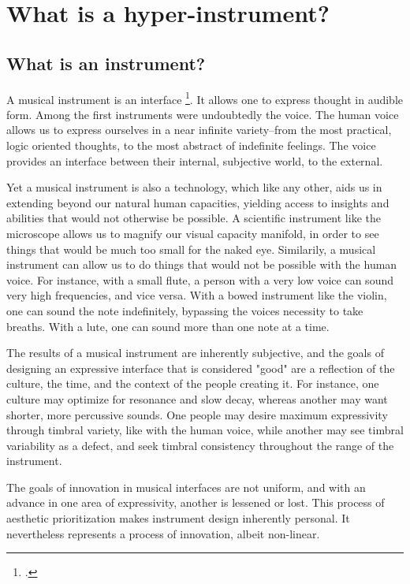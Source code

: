 \documentclass[12pt,twoside,maitrise]{dms_ks}
\theoremstyle{definition}
\begin{document}
\section{What is a hyper-instrument?}

\subsection{What is an instrument?}

A musical instrument is an interface \footcite{noauthor_instrument_nodate}. 
It allows one to express thought in audible form. 
Among the first instruments were undoubtedly the voice. 
The human voice allows us to express ourselves in a near infinite variety--from the most practical, logic oriented thoughts, to the most abstract of indefinite feelings. 
The voice provides an interface between their internal, subjective world, to the external. 

Yet a musical instrument is also a technology, which like any other, aids us in extending beyond our natural human capacities, yielding access to insights and abilities that would not otherwise be possible. 
A scientific instrument like the microscope allows us to magnify our visual capacity manifold, in order to see things that would be much too small for the naked eye. 
Similarily, a musical instrument can allow us to do things that would not be possible with the human voice. 
For instance, with a small flute, a person with a very low voice can sound very high frequencies, and vice versa. 
With a bowed instrument like the violin, one can sound the note indefinitely, bypassing the voices necessity to take breaths. 
With a lute, one can sound more than one note at a time. 

The results of a musical instrument are inherently subjective, and the goals of designing an expressive interface that is considered "good" are a reflection of the culture, the time, and the context of the people creating it. 
For instance, one culture may optimize for resonance and slow decay, whereas another may want shorter, more percussive sounds. 
One people may desire maximum expressivity through timbral variety, like with the human voice, while another may see timbral variability as a defect, and seek timbral consistency throughout the range of the instrument. 

The goals of innovation in musical interfaces are not uniform, and with an advance in one area of expressivity, another is lessened or lost. 
This process of aesthetic prioritization makes instrument design inherently personal. It nevertheless represents a process of innovation, albeit non-linear. 
\end{document}

